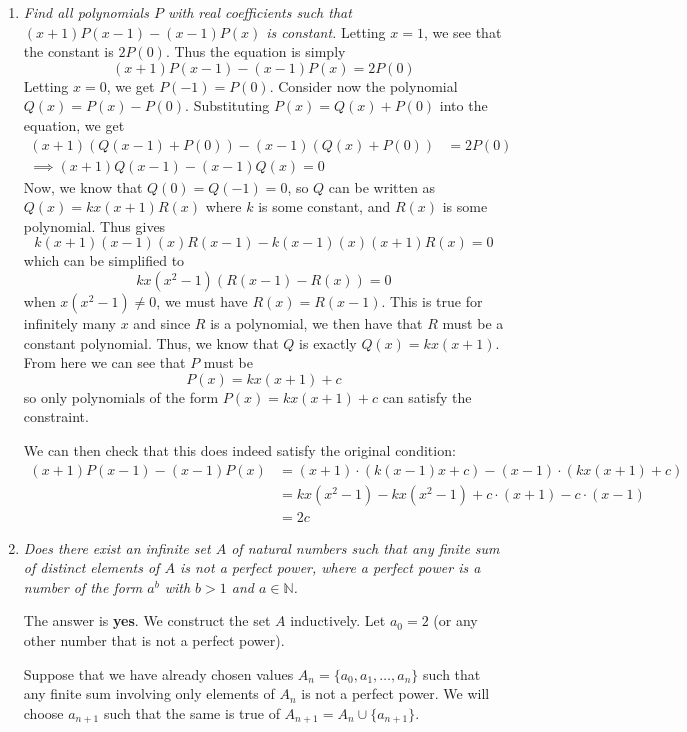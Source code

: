 \documentclass{article}
\begin{document}
\begin{enumerate}[1.]
\item %
{\itshape Find all polynomials $P$ with real coefficients such that $(x + 1)P(x - 1) - (x - 1)P(x)$ is constant.}
Letting $x = 1$, we see that the constant is $2P(0)$. Thus the equation is simply
$$(x + 1)P(x - 1) - (x - 1)P(x) = 2P(0) $$
Letting $x = 0$, we get $P(-1) = P(0)$. Consider now the polynomial $Q(x) = P(x) - P(0)$. Substituting $P(x) = Q(x) + P(0)$ into the equation, we get
\begin{align*}
  (x + 1)(Q(x - 1) + P(0)) - (x - 1)(Q(x) + P(0)) &= 2P(0) \\
  \implies (x + 1)Q(x - 1) - (x - 1)Q(x) = 0
\end{align*}
Now, we know that $Q(0) = Q(-1) = 0$, so $Q$ can be written as $Q(x) = kx(x + 1)R(x)$ where $k$ is some constant, and $R(x)$ is some polynomial. Thus gives 
$$k(x + 1)(x - 1)(x)R(x - 1) - k(x - 1)(x)(x + 1)R(x) = 0 $$
which can be simplified to
$$kx(x^2 - 1)(R(x - 1) - R(x)) = 0$$
when $x(x^2 - 1) \ne 0$, we must have $R(x) = R(x - 1)$. This is true for infinitely many $x$ and since $R$ is a polynomial, we then have that $R$ must be a constant polynomial. Thus, we know that $Q$ is exactly $Q(x) = kx(x + 1)$. From here we can see that $P$ must be
$$P(x) = kx(x + 1) + c$$
so only polynomials of the form $P(x) = kx(x + 1) + c$ can satisfy the constraint.

We can then check that this does indeed satisfy the original condition:
\begin{align*}
  (x + 1)P(x - 1) - (x - 1)P(x) &= (x + 1) \cdot (k(x - 1)x + c) - (x - 1) \cdot (kx(x + 1) + c) \\
  &= kx(x^2 - 1) - kx(x^2 - 1) + c \cdot (x + 1) - c \cdot (x - 1) \\
  &= 2c
\end{align*}

\item %
{\itshape Does there exist an infinite set $A$ of natural numbers such that any finite sum of distinct elements of $A$ is not a perfect power, where a perfect power is a number of the form $a^b$ with $b > 1$ and $a \in \mathbb{N}$.}

The answer is \textbf{yes}. We construct the set $A$ inductively. Let $a_0 = 2$ (or any other number that is not a perfect power).

Suppose that we have already chosen values $A_n = \{a_0, a_1, \dots, a_n\}$ such that any finite sum involving only elements of $A_n$ is not a perfect power. We will choose $a_{n + 1}$ such that the same is true of $A_{n + 1} = A_n \cup \{ a_{n + 1} \}$.


\end{enumerate}
\end{document}
